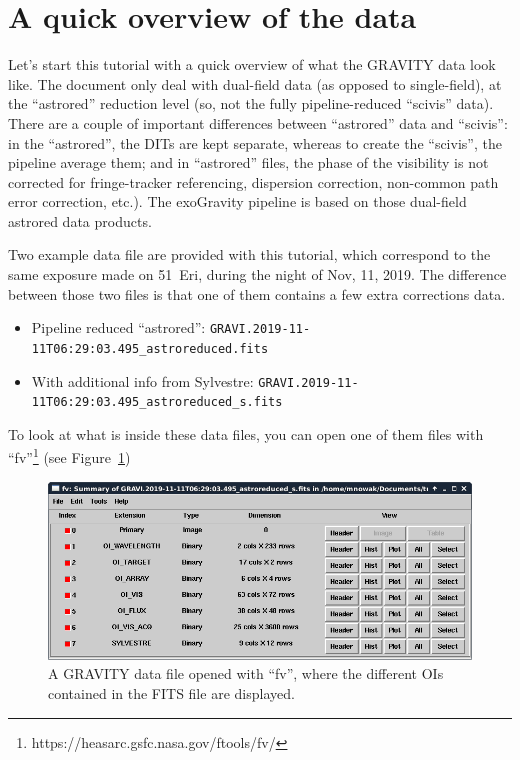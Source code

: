 \section{A quick overview of the data}

Let's start this tutorial with a quick overview of what the GRAVITY data look like. The document only deal with dual-field data (as opposed to single-field), at the ``astrored'' reduction level (so, not the fully pipeline-reduced ``scivis'' data). There are a couple of important differences between ``astrored'' data and ``scivis'': in the ``astrored'', the DITs are kept separate, whereas to create the ``scivis'', the pipeline average them; and in ``astrored'' files, the phase of the visibility is not corrected for fringe-tracker referencing, dispersion correction, non-common path error correction, etc.). The exoGravity pipeline is based on those dual-field astrored data products.

Two example data file are provided with this tutorial, which correspond to the same exposure made on 51~Eri, during the night of Nov, 11, 2019. The difference between those two files is that one of them contains a few extra corrections data.
\begin{itemize}
\item{Pipeline reduced ``astrored'': \verb|GRAVI.2019-11-11T06:29:03.495_astroreduced.fits|}
\item{With additional info from Sylvestre: \verb|GRAVI.2019-11-11T06:29:03.495_astroreduced_s.fits|}
\end{itemize}

To look at what is inside these data files, you can open one of them files with ``fv''\footnote{https://heasarc.gsfc.nasa.gov/ftools/fv/} (see Figure~\ref{fig:fv})

\begin{figure}
  \begin{center}
    \includegraphics[width=\linewidth]{figures/fv.png}
    \caption{A GRAVITY data file opened with ``fv'', where the different OIs contained in the FITS file are displayed.}
    \label{fig:fv}
  \end{center}
\end{figure}


